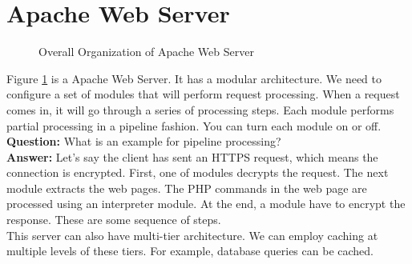 \documentclass[twoside]{article}
\begin{document}
\section{Apache Web Server}
\begin{figure}[h]
\begin{center}
\caption{Overall Organization of Apache Web Server}
\label{apache_web}
\end{center}
\end{figure}
Figure \ref{apache_web} is a Apache Web Server. It has a modular architecture. We need to configure a set of modules that will perform request processing. When a request comes in, it will go through a series of processing steps. Each module performs partial processing in a pipeline fashion. You can turn each module on or off.\\

\textbf{Question:} What is an example for pipeline processing?\\
\textbf{Answer:} Let's say the client has sent an HTTPS request, which means the connection is encrypted. First, one of modules decrypts the request. The next module extracts the web pages. The PHP commands in the web page are processed using an interpreter module. At the end, a module have to encrypt the response. These are some sequence of steps. \\
This server can also have multi-tier architecture. We can employ caching at multiple levels of these tiers. For example, database queries can be cached. 
\end{document}
